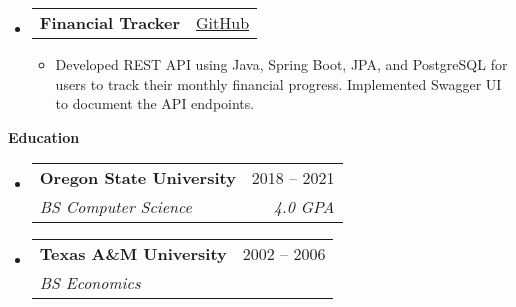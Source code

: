 \documentclass[letterpaper,11.5pt]{article}[leftmargin=*]
\makeatletter
\def \projectctext {GitHub}
\def \projectclink {https://github.com/robertjonesdev/FinancialTracker-SpringBoot}
\def \entryspacing {-0pt}
\def \projectc {\href{\projectclink}{\projectctext}}
\renewcommand{\section}[2]{\vspace{5pt}
  \colorbox{secondary}{\color{white}\raggedbottom\normalsize\textbf{{#1}{\hspace{7pt}#2}}}
}
\newcommand{\resumeEntryStart}{\begin{itemize}[leftmargin=2.5mm]}
\newcommand{\resumeEntryEnd}{\end{itemize}\vspace{\entryspacing}}
\newcommand{\resumeItemListStart}{\begin{itemize}[leftmargin=4.5mm]}
\newcommand{\resumeItemListEnd}{\end{itemize}}
\newcommand{\resumeItem}[1]{
  \item\small{
    {#1 \vspace{-2pt}}
  }
}
\newcommand{\resumeEntryTSDL}[4]{
  \vspace{-1pt}\item[]
    \begin{tabularx}{0.97\textwidth}{X@{\hspace{60pt}}r}
      \textbf{\color{primary}#1} & {\firabook\color{accent}\small#2} \\
      \textit{\color{accent}\small#3} & \textit{\color{accent}\small#4} \\
    \end{tabularx}\vspace{-6pt}
}
\newcommand{\resumeEntryTD}[2]{
  \vspace{-1pt}\item[]
    \begin{tabularx}{0.97\textwidth}{X@{\hspace{60pt}}r}
      \textbf{\color{primary}#1} & {\firabook\color{accent}\small#2} \\
    \end{tabularx}\vspace{-6pt}
}
\makeatother
\begin{document}
  \resumeEntryStart
    \resumeEntryTD
      {Financial Tracker}{\projectc}
    \resumeItemListStart
      \resumeItem {Developed REST API using Java, Spring Boot, JPA, and PostgreSQL for users to track their monthly financial progress. Implemented Swagger UI to document the API endpoints.}
    \resumeItemListEnd
  \resumeEntryEnd


\section{\faGraduationCap}{Education}

  \resumeEntryStart
    \resumeEntryTSDL
      {Oregon State University}{2018 -- 2021}
      {BS Computer Science}{4.0 GPA}
  \resumeEntryEnd

  \resumeEntryStart
    \resumeEntryTSDL
      {Texas A\&M University}{2002 -- 2006}
      {BS Economics}{ }
  \resumeEntryEnd
\end{document}
